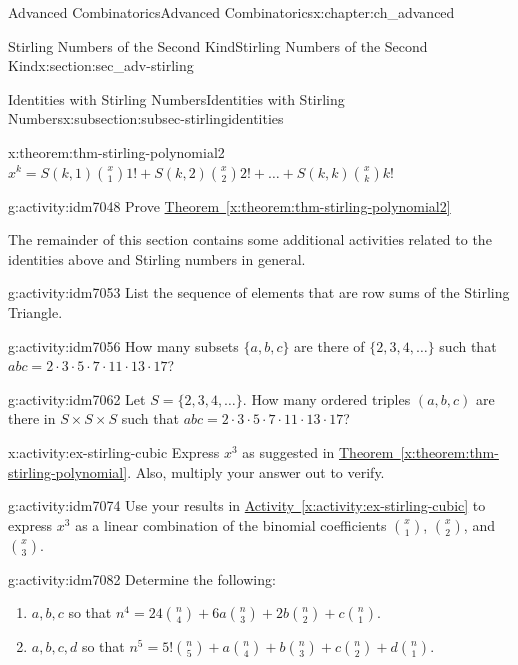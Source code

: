 \documentclass[oneside,10pt,]{book}
\numberwithin{equation}{chapter}
\begin{document}
\begin{chapterptx}{Advanced Combinatorics}{}{Advanced Combinatorics}{}{}{x:chapter:ch_advanced}
\begin{sectionptx}{Stirling Numbers of the Second Kind}{}{Stirling Numbers of the Second Kind}{}{}{x:section:sec_adv-stirling}
\begin{subsectionptx}{Identities with Stirling Numbers}{}{Identities with Stirling Numbers}{}{}{x:subsection:subsec-stirlingidentities}
\begin{theorem}{}{}{x:theorem:thm-stirling-polynomial2}
\(x^{k} = S\left(k,1 \right)\binom{x}{1}1! + S\left(k,2 \right) \binom{x}{2}2! + \ldots + S\left(k,k \right)\binom{x}{k} k!\)%
\end{theorem}
\begin{activity}{}{g:activity:idm7048}%
Prove \hyperref[x:theorem:thm-stirling-polynomial2]{Theorem~\ref{x:theorem:thm-stirling-polynomial2}}%
\end{activity}
The remainder of this section contains some additional activities related to the identities above and Stirling numbers in general.%
\begin{activity}{}{g:activity:idm7053}%
List the sequence of elements that are row sums of the Stirling Triangle.%
\end{activity}
\begin{activity}{}{g:activity:idm7056}%
How many subsets \(\{a,b,c\}\) are there of \(\{2,3,4,\ldots\}\) such that \(abc = 2 \cdot 3 \cdot 5 \cdot 7 \cdot 11 \cdot 13 \cdot 17\)?%
\end{activity}
\begin{activity}{}{g:activity:idm7062}%
Let \(S = \{2,3,4,\ldots\}\).  How many ordered triples \((a,b,c)\) are there in \(S\times S \times S\) such that \(abc = 2 \cdot 3 \cdot 5 \cdot 7 \cdot 11 \cdot 13 \cdot 17\)?%
\end{activity}
\begin{activity}{}{x:activity:ex-stirling-cubic}%
Express \(x^3\) as suggested in \hyperref[x:theorem:thm-stirling-polynomial]{Theorem~\ref{x:theorem:thm-stirling-polynomial}}.  Also, multiply your answer out to verify.%
\end{activity}
\begin{activity}{}{g:activity:idm7074}%
Use your results in \hyperref[x:activity:ex-stirling-cubic]{Activity~\ref{x:activity:ex-stirling-cubic}} to express \(x^3\) as a linear combination of the binomial coefficients \(\binom{x}{1}\), \(\binom{x}{2}\), and \(\binom{x}{3}\).%
\end{activity}
\begin{activity}{}{g:activity:idm7082}%
Determine the following:%
\begin{enumerate}[font=\bfseries,label=(\alph*),ref=\alph*]
\item{}\(a, b, c\) so that \(n^4 = 24\binom{n}{4} + 6a\binom{n}{3}+2b\binom{n}{2} + c \binom{n}{1}\).%
\item{}\(a, b, c, d\) so that \(n^5 = 5!\binom{n}{5} + a\binom{n}{4} + b\binom{n}{3} + c \binom{n}{2} + d \binom{n}{1}\).%
\end{enumerate}

\end{activity}
\end{subsectionptx}
\end{sectionptx}
\end{chapterptx}
\end{document}
